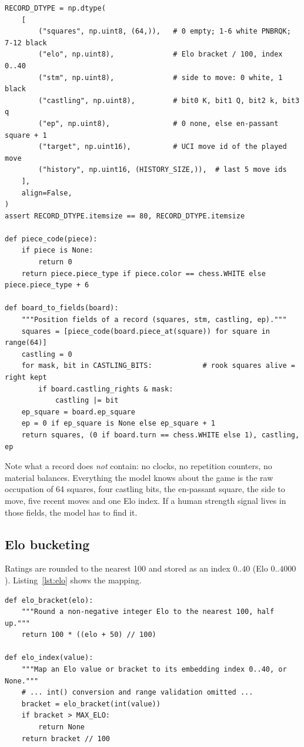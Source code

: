 \documentclass[10pt,a4paper]{article}
\newcommand{\code}[1]{\texttt{#1}}
\begin{document}
\begin{lstlisting}[style=code, caption={The training record and its
encoder (\code{fen\_codec.py}). A position is exactly
$64+1+1+1+1 = 68$ bytes; Elo, target and history complete the 80-byte
record.}, label={lst:record}, float=htbp]
RECORD_DTYPE = np.dtype(
    [
        ("squares", np.uint8, (64,)),   # 0 empty; 1-6 white PNBRQK; 7-12 black
        ("elo", np.uint8),              # Elo bracket / 100, index 0..40
        ("stm", np.uint8),              # side to move: 0 white, 1 black
        ("castling", np.uint8),         # bit0 K, bit1 Q, bit2 k, bit3 q
        ("ep", np.uint8),               # 0 none, else en-passant square + 1
        ("target", np.uint16),          # UCI move id of the played move
        ("history", np.uint16, (HISTORY_SIZE,)),  # last 5 move ids
    ],
    align=False,
)
assert RECORD_DTYPE.itemsize == 80, RECORD_DTYPE.itemsize

def piece_code(piece):
    if piece is None:
        return 0
    return piece.piece_type if piece.color == chess.WHITE else piece.piece_type + 6

def board_to_fields(board):
    """Position fields of a record (squares, stm, castling, ep)."""
    squares = [piece_code(board.piece_at(square)) for square in range(64)]
    castling = 0
    for mask, bit in CASTLING_BITS:            # rook squares alive = right kept
        if board.castling_rights & mask:
            castling |= bit
    ep_square = board.ep_square
    ep = 0 if ep_square is None else ep_square + 1
    return squares, (0 if board.turn == chess.WHITE else 1), castling, ep
\end{lstlisting}

Note what a record does \emph{not} contain: no clocks, no repetition
counters, no material balances. Everything the model knows about the game
is the raw occupation of 64 squares, four castling bits, the en-passant
square, the side to move, five recent moves and one Elo index. If a human
strength signal lives in those fields, the model has to find it.

\subsection{Elo bucketing}

Ratings are rounded to the nearest 100 and stored as an index $0..40$
(Elo $0..4000$). Listing~\ref{lst:elo} shows the mapping.

\begin{lstlisting}[style=code, caption={Elo to embedding index
(\code{fen\_codec.py}, validation trimmed). \code{None} means ``no token
for this value'': such games are skipped at data time, and inference
rejects the input.}, label={lst:elo}, float=htbp]
def elo_bracket(elo):
    """Round a non-negative integer Elo to the nearest 100, half up."""
    return 100 * ((elo + 50) // 100)

def elo_index(value):
    """Map an Elo value or bracket to its embedding index 0..40, or None."""
    # ... int() conversion and range validation omitted ...
    bracket = elo_bracket(int(value))
    if bracket > MAX_ELO:
        return None
    return bracket // 100
\end{lstlisting}
\end{document}
